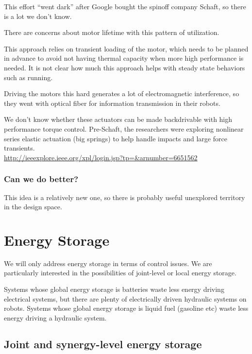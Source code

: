 \documentclass[letterpaper,12pt,fullpage]{article}
\begin{document}
This effort ``went dark'' after Google bought the spinoff company
Schaft, so there is a lot we don't know.

There are concerns about motor lifetime with this pattern of utilization.

This approach relies on transient loading of the motor, which needs
to be planned in advance to avoid not having thermal capacity
when more high performance is needed.
It is not clear how much this approach helps with 
steady state behaviors such as running.

Driving the motors this hard generates a lot of electromagnetic interference,
so they went with optical fiber for information transmission in their
robots.

We don't know whether these actuators can be made backdrivable with
high performance torque control. Pre-Schaft, the researchers were exploring
nonlinear series elastic actuation (big springs)
to help handle impacts and large force
transients.\\
\url{http://ieeexplore.ieee.org/xpl/login.jsp?tp=&arnumber=6651562}\\

\subsubsection{Can we do better?}

This idea is a relatively new one, so there is probably useful unexplored
territory in the design space.

\section{Energy Storage}

We will only address energy storage
in terms of control issues. We are particularly interested in the
possibilities of joint-level or local energy storage.

Systems whose global energy storage is batteries waste
less energy driving electrical systems, but there are plenty of electrically
driven hydraulic systems on robots.
Systems whose global energy storage is liquid fuel (gasoline etc)
waste less energy driving a hydraulic system.

\subsection{Joint and synergy-level energy storage}
\end{document}
